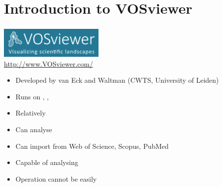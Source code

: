 \documentclass[8pt]{beamer}
\begin{document}




\section{Introduction to VOSviewer}

\bgroup
{}
\begin{frame}[plain]{}
\begin{center}
\color{white}{\Huge\insertsection}
\end{center}
\end{frame}
\egroup


\begin{frame}
\frametitle{\insertsection}

\begin{center}
\includegraphics[height=1.5cm]{vos_logo}\\
\url{http://www.VOSviewer.com/}
\end{center}

\begin{itemize}
\item Developed by van Eck and Waltman (CWTS, University of Leiden) 
\item Runs on {\color{blue}{Windows}}, {\color{blue}{Linux}}, {\color{blue}{Mac OSX}}
\item Relatively {\color{blue}{user-friendly}}
\item Can analyse {\color{blue}{scientometric data}}
\item Can import {\color{blue}{raw data}} from Web of Science, Scopus, PubMed
\item Capable of analysing {\color{blue}{relatively large networks}}
\item Operation cannot be easily {\color{red}{automated}}

\end{itemize}

\end{frame}
\end{document}
